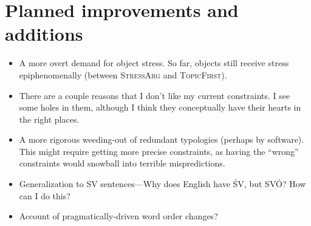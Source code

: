 \documentclass{article}
\newcommand{\topf}{\textsc{TopicFirst}}
\newcommand{\starg}{\textsc{StressArg}}
\begin{document}
\section{Planned improvements and additions}
\begin{itemize}
\item A more overt demand for object stress. So far, objects still receive stress epiphenomenally (between {\starg} and {\topf}).
\item There are a couple reasons that I don't like my current constraints. I see some holes in them, although I think they conceptually have their hearts in the right places.
\item A more rigorous weeding-out of redundant typologies (perhaps by software). This might require getting more precise constraints, as having the ``wrong'' constraints would snowball into terrible mispredictions.
\item Generalization to SV sentences---Why does English have \'SV, but SV\'O? How can I do this?
\item Account of pragmatically-driven word order changes? \parencite{bolinger54}

\end{itemize}


\printbibliography
\end{document}
